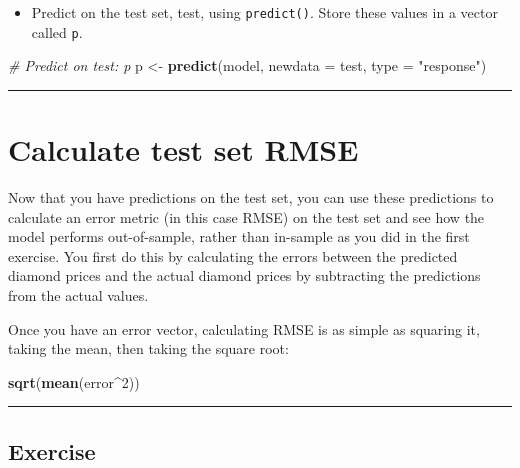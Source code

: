 \documentclass[
]{book}
\newenvironment{Shaded}{\begin{snugshade}}{\end{snugshade}}
\newcommand{\CommentTok}[1]{\textcolor[rgb]{0.56,0.35,0.01}{\textit{#1}}}
\newcommand{\DataTypeTok}[1]{\textcolor[rgb]{0.13,0.29,0.53}{#1}}
\newcommand{\DecValTok}[1]{\textcolor[rgb]{0.00,0.00,0.81}{#1}}
\newcommand{\KeywordTok}[1]{\textcolor[rgb]{0.13,0.29,0.53}{\textbf{#1}}}
\newcommand{\NormalTok}[1]{#1}
\newcommand{\OperatorTok}[1]{\textcolor[rgb]{0.81,0.36,0.00}{\textbf{#1}}}
\newcommand{\StringTok}[1]{\textcolor[rgb]{0.31,0.60,0.02}{#1}}
\providecommand{\tightlist}{%
  \setlength{\itemsep}{0pt}\setlength{\parskip}{0pt}}
\begin{document}
\begin{itemize}
\tightlist
\item
  Predict on the test set, test, using \texttt{predict()}. Store these values in a vector called \texttt{p}.
\end{itemize}

\begin{Shaded}
\begin{Highlighting}[]
\CommentTok{# Predict on test: p}
\NormalTok{p <-}\StringTok{ }\KeywordTok{predict}\NormalTok{(model, }\DataTypeTok{newdata =}\NormalTok{ test, }\DataTypeTok{type =} \StringTok{"response"}\NormalTok{)}
\end{Highlighting}
\end{Shaded}

\begin{center}\rule{0.5\linewidth}{0.5pt}\end{center}

\hypertarget{calculate-test-set-rmse}{%
\section{Calculate test set RMSE}\label{calculate-test-set-rmse}}

Now that you have predictions on the test set, you can use these predictions to calculate an error metric (in this case RMSE) on the test set and see how the model performs out-of-sample, rather than in-sample as you did in the first exercise. You first do this by calculating the errors between the predicted diamond prices and the actual diamond prices by subtracting the predictions from the actual values.

Once you have an error vector, calculating RMSE is as simple as squaring it, taking the mean, then taking the square root:

\begin{Shaded}
\begin{Highlighting}[]
\KeywordTok{sqrt}\NormalTok{(}\KeywordTok{mean}\NormalTok{(error}\OperatorTok{^}\DecValTok{2}\NormalTok{))}
\end{Highlighting}
\end{Shaded}

\begin{center}\rule{0.5\linewidth}{0.5pt}\end{center}

\hypertarget{exercise-4}{%
\subsection*{Exercise}\label{exercise-4}}
\end{document}

